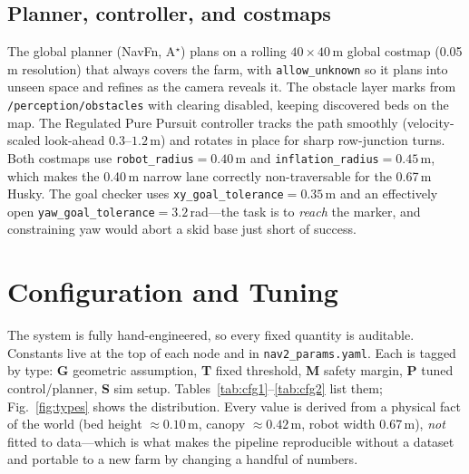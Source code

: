 \documentclass[10pt,journal,twoside]{IEEEtran}
\begin{document}
\subsection{Planner, controller, and costmaps}
The global planner (NavFn, A$^\star$) plans on a rolling $40\times40$\,m global costmap (0.05\,m resolution) that always covers the farm, with \texttt{allow\_unknown} so it plans into unseen space and refines as the camera reveals it. The obstacle layer marks from \texttt{/perception/obstacles} with clearing disabled, keeping discovered beds on the map. The Regulated Pure Pursuit controller tracks the path smoothly (velocity-scaled look-ahead $0.3$--$1.2$\,m) and rotates in place for sharp row-junction turns. Both costmaps use \texttt{robot\_radius}$=0.40$\,m and \texttt{inflation\_radius}$=0.45$\,m, which makes the 0.40\,m narrow lane correctly non-traversable for the 0.67\,m Husky. The goal checker uses \texttt{xy\_goal\_tolerance}$=0.35$\,m and an effectively open \texttt{yaw\_goal\_tolerance}$=3.2$\,rad---the task is to \emph{reach} the marker, and constraining yaw would abort a skid base just short of success.

\section{Configuration and Tuning}
The system is fully hand-engineered, so every fixed quantity is auditable. Constants live at the top of each node and in \texttt{nav2\_params.yaml}. Each is tagged by type: \textbf{G} geometric assumption, \textbf{T} fixed threshold, \textbf{M} safety margin, \textbf{P} tuned control/planner, \textbf{S} sim setup. Tables~\ref{tab:cfg1}--\ref{tab:cfg2} list them; Fig.~\ref{fig:types} shows the distribution. Every value is derived from a physical fact of the world (bed height $\approx0.10$\,m, canopy $\approx0.42$\,m, robot width 0.67\,m), \emph{not} fitted to data---which is what makes the pipeline reproducible without a dataset and portable to a new farm by changing a handful of numbers.
\end{document}
